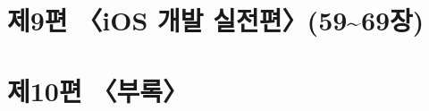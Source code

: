 \documentclass[11pt,a4paper,openany]{book}
\begin{document}
\part*{제9편 〈iOS 개발 실전편〉(59\textasciitilde{}69장)}











\appendix
\part*{제10편 〈부록〉}









\end{document}
